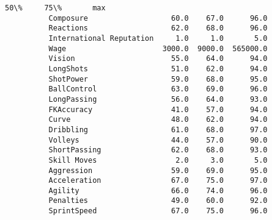 \documentclass[11pt]{article}
\begin{document}
\begin{Verbatim}[commandchars=\\\{\}]
                                       50\%     75\%       max  
          Composure                   60.0    67.0      96.0  
          Reactions                   62.0    68.0      96.0  
          International Reputation     1.0     1.0       5.0  
          Wage                      3000.0  9000.0  565000.0  
          Vision                      55.0    64.0      94.0  
          LongShots                   51.0    62.0      94.0  
          ShotPower                   59.0    68.0      95.0  
          BallControl                 63.0    69.0      96.0  
          LongPassing                 56.0    64.0      93.0  
          FKAccuracy                  41.0    57.0      94.0  
          Curve                       48.0    62.0      94.0  
          Dribbling                   61.0    68.0      97.0  
          Volleys                     44.0    57.0      90.0  
          ShortPassing                62.0    68.0      93.0  
          Skill Moves                  2.0     3.0       5.0  
          Aggression                  59.0    69.0      95.0  
          Acceleration                67.0    75.0      97.0  
          Agility                     66.0    74.0      96.0  
          Penalties                   49.0    60.0      92.0  
          SprintSpeed                 67.0    75.0      96.0  
\end{Verbatim}
            
\end{document}
